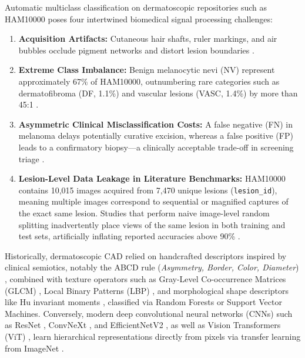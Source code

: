 \documentclass[11pt,a4paper]{article}
\begin{document}
Automatic multiclass classification on dermatoscopic repositories such as HAM10000 \cite{tschandl2018} poses four intertwined biomedical signal processing challenges:
\begin{enumerate}
    \item \textbf{Acquisition Artifacts:} Cutaneous hair shafts, ruler markings, and air bubbles occlude pigment networks and distort lesion boundaries \cite{lee1997, celebi2019}.
    \item \textbf{Extreme Class Imbalance:} Benign melanocytic nevi (NV) represent approximately 67\% of HAM10000, outnumbering rare categories such as dermatofibroma (DF, 1.1\%) and vascular lesions (VASC, 1.4\%) by more than 45:1 \cite{tschandl2018}.
    \item \textbf{Asymmetric Clinical Misclassification Costs:} A false negative (FN) in melanoma delays potentially curative excision, whereas a false positive (FP) leads to a confirmatory biopsy---a clinically acceptable trade-off in screening triage \cite{codella2019}.
    \item \textbf{Lesion-Level Data Leakage in Literature Benchmarks:} HAM10000 contains 10,015 images acquired from 7,470 unique lesions (\texttt{lesion\_id}), meaning multiple images correspond to sequential or magnified captures of the exact same lesion. Studies that perform naive image-level random splitting inadvertently place views of the same lesion in both training and test sets, artificially inflating reported accuracies above 90\% \cite{cassidy2022, maron2019}.
\end{enumerate}

Historically, dermatoscopic CAD relied on handcrafted descriptors inspired by clinical semiotics, notably the ABCD rule (\textit{Asymmetry, Border, Color, Diameter}) \cite{nachbar1994}, combined with texture operators such as Gray-Level Co-occurrence Matrices (GLCM) \cite{haralick1973}, Local Binary Patterns (LBP) \cite{ojala2002}, and morphological shape descriptors like Hu invariant moments \cite{hu1962}, classified via Random Forests \cite{breiman2001} or Support Vector Machines. Conversely, modern deep convolutional neural networks (CNNs) such as ResNet \cite{he2016}, ConvNeXt \cite{liu2022}, and EfficientNetV2 \cite{tan2021}, as well as Vision Transformers (ViT) \cite{dosovitskiy2021, liu2021swin}, learn hierarchical representations directly from pixels via transfer learning from ImageNet \cite{deng2009}.
\end{document}
